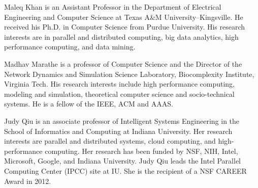 \begin{IEEEbiography}{Maleq Khan} is an Assistant Professor in the Department of Electrical Engineering and Computer Science at Texas A\&M University--Kingsville. He received his Ph.D. in Computer Science from Purdue University. His research interests are in parallel and distributed computing, big data analytics, high performance computing, and data mining. 
 \end{IEEEbiography}

\vspace{-2.2cm}

\begin{IEEEbiography}{Madhav Marathe}
 is a professor of Computer Science and the Director of  the Network
 Dynamics and Simulation Science Laboratory, Biocomplexity Institute, Virginia Tech.
 His research interests include high performance computing, modeling and simulation, theoretical computer science
 and socio-technical systems. He is a fellow of the IEEE, ACM and AAAS.
\end{IEEEbiography}

\vspace{-2.2cm}

\begin{IEEEbiography}{Judy Qiu}
 is an associate professor of Intelligent Systems Engineering in the School of
 Informatics and Computing at Indiana University. Her research interests are
 parallel and distributed systems, cloud computing, and high-performance
 computing. Her research has been funded by NSF, NIH, Intel, Microsoft, Google,
 and Indiana University. Judy Qiu leads the Intel Parallel Computing Center
 (IPCC) site at IU. She is the recipient of a NSF CAREER Award in 2012.
 \end{IEEEbiography} 
 
